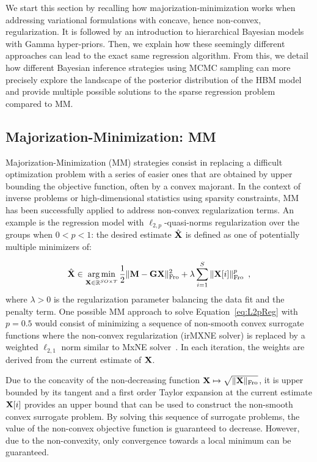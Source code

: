 We start this section by recalling how majorization-minimization works
when addressing variational formulations with concave, hence non-convex, regularization.
It is followed by an introduction to hierarchical Bayesian models with Gamma hyper-priors.
Then, we explain how these seemingly different approaches can lead to the
exact same regression algorithm.
From this, we detail how different Bayesian inference strategies using MCMC
sampling can more precisely explore the landscape of the posterior distribution of the HBM model and provide multiple possible solutions to the sparse regression problem compared to MM.

\subsection{Majorization-Minimization: MM}
\label{section:MM}

Majorization-Minimization (MM) strategies consist in replacing a difficult optimization problem with a series of easier ones that are obtained by upper bounding the objective function, often by a convex majorant.
%
In the context of inverse problems or high-dimensional statistics using sparsity constraints, MM has been successfully applied to address non-convex regularization terms. An example is the regression model with $\ell_{2,p}$-quasi-norms regularization over the groups when $0<p<1$: the desired estimate $\hat{\mathbf{X}}$ is defined as one of potentially multiple minimizers of:

\begin{equation} \label{eq:L2pReg}
\hat{\mathbf{X}} \in \mathop{\mathrm{arg}\,\mathrm{min}}_{\mathbf{X}\in\mathbb{R}^{SO \times T}} \frac{1}{2} \|{\mathbf{M} - \mathbf{G} \mathbf{X}}\|_{\rm Fro}^2  + \lambda \sum_{i=1}^S \|{\mathbf{X}{[i]}}\|_{\rm Fro}^p \enspace,
\end{equation}
where $\lambda > 0$ is the regularization parameter balancing the data fit and the penalty term. One possible MM approach to solve Equation~\eqref{eq:L2pReg} with $p=0.5$ would consist of minimizing a sequence of non-smooth convex surrogate functions where the non-convex regularization (irMXNE solver) is replaced by a weighted $\ell_{2,1}$ norm similar to MxNE solver~\cite{strohmeier-etal:16}. In each iteration, the weights are derived from the current estimate of $\mathbf{X}$.

Due to the concavity of the non-decreasing function $\mathbf{X}\mapsto\sqrt{\|{\mathbf{X}}\|_{\rm Fro}}$, it is upper bounded by its tangent and a first order Taylor expansion at the current estimate $\mathbf{X}{[i]}$ provides an upper bound that can be used to construct the non-smooth convex surrogate problem. By solving this sequence of surrogate problems, the value of the non-convex objective function is guaranteed to decrease. However, due to the non-convexity, only convergence towards a local minimum can be guaranteed.


